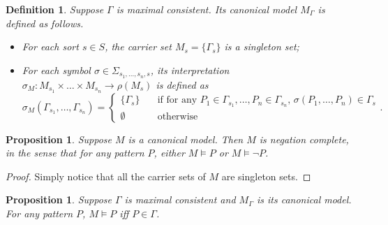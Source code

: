 \documentclass{article}
\theoremstyle{plain}
\newtheorem{prop}[thm]{Proposition}
\newtheorem{defn}[thm]{Definition}
\begin{document}
\begin{defn}
Suppose $\Gamma$ is maximal consistent. Its canonical model $M_\Gamma$ is defined as follows.
\begin{itemize}
\item For each sort $s \in S$, the carrier set $M_s = \{\Gamma_s\}$ is a singleton set;
\item For each symbol $\sigma \in \Sigma_{s_1,\dots,s_n,s}$, its interpretation $\sigma_M \colon M_{s_1} \times \dots \times M_{s_n} \to \rho(M_s)$ is defined as
\begin{equation*}
\sigma_M(\Gamma_{s_1},\dots,\Gamma_{s_n}) = \begin{cases}
                                            \{\Gamma_s\} \quad &\text{if for any $P_1 \in \Gamma_{s_1}, \dots, P_n \in \Gamma_{s_n}$, $\sigma(P_1,\dots,P_n) \in \Gamma_s$} \\
                                            \emptyset    \quad &\text{otherwise}
                                            \end{cases}.
\end{equation*}
\end{itemize}
\end{defn}

\begin{prop}
Suppose $M$ is a canonical model. Then $M$ is negation complete, in the sense that for any pattern $P$, either $M \vDash P$ or $M \vDash \neg P$.
\end{prop}
\begin{proof}
Simply notice that all the carrier sets of $M$ are singleton sets.
\end{proof}

\begin{prop} \label{prop:canonicalmodel}
Suppose $\Gamma$ is maximal consistent and $M_\Gamma$ is its canonical model. For any pattern $P$, $M \vDash P$ iff $P \in \Gamma$.
\end{prop}
\end{document}
